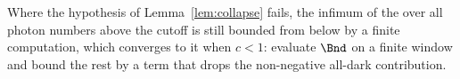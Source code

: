 
Where the hypothesis of Lemma~\ref{lem:collapse} fails, the infimum of the
 over all photon numbers above the cutoff is still
bounded from below by a finite computation, which converges to it when
$c<1$: evaluate $\Bnd$ on a finite window and bound the rest by a term that
drops the non-negative all-dark contribution.

